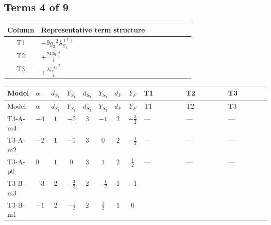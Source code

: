 \documentclass[8pt]{article}
\begin{document}
\begin{landscape}
\subsection*{Terms 4 of 9}
\begin{center}
\begin{tabular}{@{}c >{\raggedright\arraybackslash}p{0.82\linewidth}@{}}
\toprule
Column & Representative term structure \\
\midrule
T1 & \(\displaystyle -9 {g_2}^2 {\lambda_{S_1}^{(1)}}\) \\
\midrule
T2 & \(\displaystyle +\frac{243 {g_1}^4}{4}\) \\
\midrule
T3 & \(\displaystyle +\frac{{\lambda_{12}^{(A)}}^2}{4}\) \\
\midrule
\bottomrule
\end{tabular}
\end{center}
\smallskip
\tiny
\begin{longtable}{@{}llcccccc >{\raggedright\arraybackslash}p{0.21\linewidth} >{\raggedright\arraybackslash}p{0.21\linewidth} >{\raggedright\arraybackslash}p{0.21\linewidth}@{}}
\toprule
Model & $\alpha$ & $d_{S_1}$ & $Y_{S_1}$ & $d_{S_2}$ & $Y_{S_2}$ & $d_F$ & $Y_F$ & T1 & T2 & T3 \\
\midrule
\endfirsthead
\toprule
Model & $\alpha$ & $d_{S_1}$ & $Y_{S_1}$ & $d_{S_2}$ & $Y_{S_2}$ & $d_F$ & $Y_F$ & T1 & T2 & T3 \\
\midrule
\endhead
T3-A-m4 & $-4$ & $1$ & $-2$ & $3$ & $-1$ & $2$ & $-\frac{3}{2}$ & --- & --- & --- \\
\midrule
T3-A-m2 & $-2$ & $1$ & $-1$ & $3$ & $0$ & $2$ & $-\frac{1}{2}$ & --- & --- & --- \\
\midrule
T3-A-p0 & $0$ & $1$ & $0$ & $3$ & $1$ & $2$ & $\frac{1}{2}$ & --- & --- & --- \\
\midrule
T3-B-m3 & $-3$ & $2$ & $-\frac{3}{2}$ & $2$ & $-\frac{1}{2}$ & $1$ & $-1$ & \scriptsize\adjustbox{max width=\linewidth}{$\begin{gathered} -9 {g_2}^2 {\lambda_{S_1}^{(1)}}\end{gathered}$} & \scriptsize\adjustbox{max width=\linewidth}{$\begin{gathered} +\frac{243 {g_1}^4}{4}\end{gathered}$} & \scriptsize\adjustbox{max width=\linewidth}{$\begin{gathered} +\frac{{\lambda_{12}^{(A)}}^2}{4}\end{gathered}$} \\
\midrule
T3-B-m1 & $-1$ & $2$ & $-\frac{1}{2}$ & $2$ & $\frac{1}{2}$ & $1$ & $0$ & \scriptsize\adjustbox{max width=\linewidth}{$\begin{gathered} -9 {g_2}^2 {\lambda_{S_1}^{(1)}}\end{gathered}$} & \scriptsize\adjustbox{max width=\linewidth}{$\begin{gathered} +\frac{3 {g_1}^4}{4}\end{gathered}$} & \scriptsize\adjustbox{max width=\linewidth}{$\begin{gathered} +\frac{{\lambda_{12}^{(A)}}^2}{4}\end{gathered}$} \\

\end{longtable}
\end{landscape}
\end{document}
